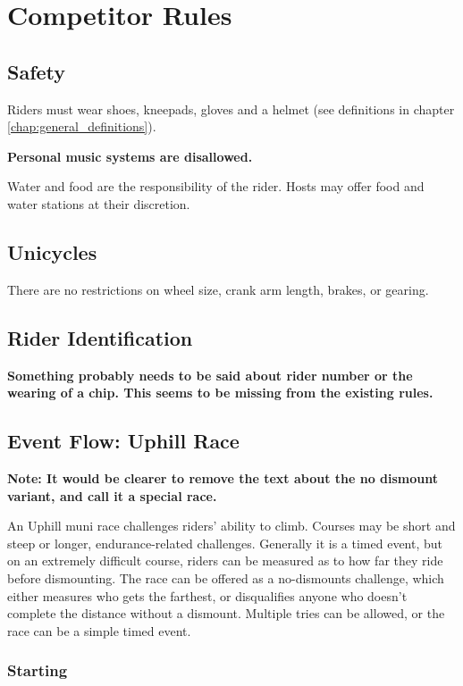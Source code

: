 \chapter{Competitor Rules}

\section{Safety}
Riders must wear shoes, kneepads, gloves and a helmet (see definitions in chapter \ref{chap:general_definitions}).

\textbf{Personal music systems are disallowed.}

Water and food are the responsibility of the rider. Hosts may offer food and water stations at their discretion.

\section{Unicycles}

There are no restrictions on wheel size, crank arm length, brakes, or gearing.

\section{Rider Identification}

\textbf{Something probably needs to be said about rider number or the wearing of a chip.  This seems to be missing from the existing rules.}

\section{Event Flow: Uphill Race \label{sec:muni_uphill}}

\textbf{Note: It would be clearer to remove the text about the no dismount variant, and call it a special race.}

An Uphill muni race challenges riders' ability to climb.
Courses may be short and steep or longer, endurance-related challenges. 
Generally it is a timed event, but on an extremely difficult course, riders can be measured as to how far they ride before dismounting.
The race can be offered as a no-dismounts challenge, which either measures who gets the farthest, or disqualifies anyone who doesn't complete the distance without a dismount.
Multiple tries can be allowed, or the race can be a simple timed event.

\subsection{Starting}

